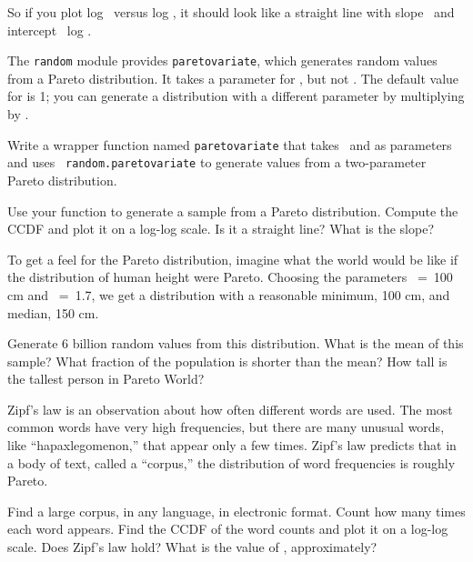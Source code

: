 \documentclass[12pt]{book}
\begin{document}
So if you plot log \y~versus log \x, it should look like a straight
line with slope \minus\myalpha~and intercept
\myalpha~log \x{}.

\begin{exercise}
The {\tt random} module provides {\tt paretovariate},
which generates random values from a Pareto distribution.  It takes
a parameter for \myalpha, but not \x{}.  The
default value for \x{} is 1; you can generate a distribution
with a different parameter by multiplying by \x{}.

Write a wrapper function named {\tt paretovariate} that takes
\myalpha~and \x {} as parameters and uses {\tt
  random.paretovariate} to generate values from a two-parameter Pareto
distribution.

Use your function to generate a sample from a Pareto distribution.
Compute the CCDF and plot it on a log-log scale.  Is it a straight
line?  What is the slope?

\end{exercise}

\begin{exercise}
To get a feel for the Pareto distribution, imagine what the world
would be like if the distribution of human height were Pareto.
Choosing the parameters \x {}~=~100 cm and \myalpha~=~1.7, we
get a distribution with a reasonable minimum, 100 cm,
and median, 150 cm.

Generate 6 billion random values from this distribution.  What is the
mean of this sample?  What fraction of the population is shorter than
the mean?  How tall is the tallest person in Pareto World?

\end{exercise}

\begin{exercise}
Zipf's law is an observation about how often different words are used.
The most common words have very high frequencies, but there are many
unusual words, like ``hapaxlegomenon,'' that appear only a few times.
Zipf's law predicts that in a body of text, called a ``corpus,'' the
distribution of word frequencies is roughly Pareto.

Find a large corpus, in any language, in electronic
format.  Count how many times each word appears.  Find the CCDF of the
word counts and plot it on a log-log scale.  Does Zipf's law hold?
What is the value of \myalpha, approximately?

\end{exercise}
\end{document}
